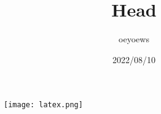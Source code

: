 \documentclass{article}
\title{Head}
\author{oeyoews}
\date{2022/08/10}
\begin{document}
\maketitle

\thispagestyle{empty}
\setcounter{page}{1}

\begin{figure}[b]
	\centering
	\texttt{[image: latex.png]}
\end{figure}
\end{document}

